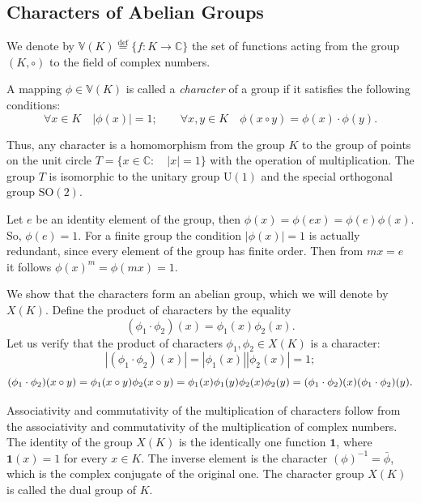 \documentclass[11pt]{article}
\theoremstyle{definition}
\begin{document}
{{{\subsection{Characters of Abelian Groups}

We denote by $\mathbb{V}(K)\stackrel{\text{def}}{=}\{f:K\rightarrow\mathbb{C}\}$ the set of functions acting from the group $(K,\circ)$ to the field of
complex numbers.

A mapping $\phi\in\mathbb{V}(K)$ is called  a {\sl   character} of a group if it  
  satisfies the following conditions:
    \begin{equation}\label{eq:char}
    \forall x\in K\quad |\phi(x)|=1;\qquad
    \forall x,y\in K\quad \phi(x\circ y)=\phi(x)\cdot{\phi(y)}.
    \end{equation}



Thus, any character is a homomorphism from the
group $K$ to the group of points on the unit circle
$T=\{x\in\mathbb{C}:\quad|x|=1\}$ with the operation of multiplication. The group $T$
is isomorphic to the unitary group $\mathrm{U}(1)$ and the special
orthogonal group $\mathrm{SO}(2)$.

Let $e$ be an identity element of the group, then $\phi(x)=\phi(ex)=\phi(e)\phi(x)$. So, $\phi(e)=1$.
For a finite group the condition $|\phi(x)|=1$ is actually redundant, since every element of the group has finite order. Then from $mx=e$ it follows $\phi(x)^m=\phi(mx)=1$.


We show that the characters form an abelian group, which we will
denote by $X(K)$. Define the product of characters by the equality
$$(\phi_1\cdot\phi_2)(x)=\phi_1(x)\phi_2(x).$$ Let us verify that the
product of characters $\phi_1,\phi_2\in X(K)$ is a character:
$$|(\phi_1\cdot\phi_2)(x)|=|\phi_1(x)||\phi_2(x)|=1;$$
$$(\phi_1\cdot\phi_2)(x\circ y)=\phi_1(x\circ y)\phi_2(x\circ y)
\hfill =\phi_1(x)\phi_1(y)\phi_2(x)\phi_2(y)
=(\phi_1\cdot\phi_2)(x)(\phi_1\cdot\phi_2)(y).$$

Associativity and commutativity of the multiplication of characters
follow from the associativity and commutativity of the multiplication of
complex numbers. The identity of the group $X(K)$ is the identically
one function  $\mathbf{1}$, where $\mathbf{1}(x)=1$ for every $x\in K$. The inverse element is the
character $(\phi)^{-1}=\bar\phi$, which is the complex conjugate of the original one.
The character group $X(K)$ is called the dual group of $K$.





}}}
\end{document}
